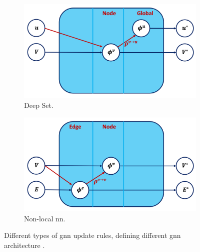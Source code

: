 \begin{figure}[h!]
    \begin{subfigure}[b]{0.49\textwidth}
        \centering
        \includegraphics[scale=0.43]{Images/ML/deepSet.png}
        \caption{Deep Set.} 
        \label{fig:deepSetFig}
    \end{subfigure}
    \hfill
    \begin{subfigure}[b]{0.49\textwidth}
        \centering
        \includegraphics[scale=0.43]{Images/ML/nlnn.png}
        \caption{Non-local \gls{nn}.} 
        \label{fig:pullsFTAGnlnn}
    \end{subfigure}
    \caption{Different types of \gls{gnn} update rules, defining different \gls{gnn} architecture \cite{graphInductiveBias}.}
    \label{fig:diverseGNN}
\end{figure} 

